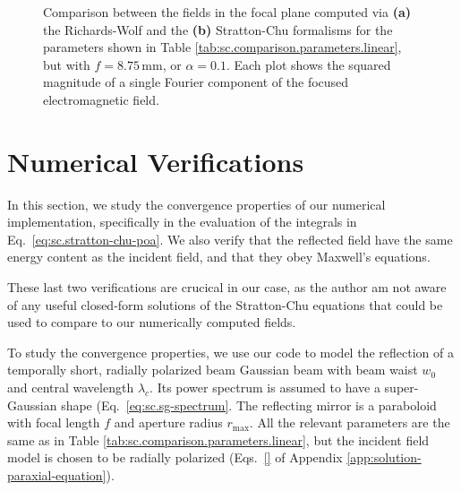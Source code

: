 \documentclass[11pt,SymmetricalJury]{inrsthesis/inrsthesis}
\begin{document}
\begin{figure}
\caption[Richards-Wolf vs Stratton-Chu: fields in the focal plane, VSF.LIN.G.f0.00875.]
        {Comparison between the fields in the focal plane computed via \textbf{(a)}
        the Richards-Wolf and the \textbf{(b)} Stratton-Chu formalisms for the
        parameters shown in Table \ref{tab:sc.comparison.parameters.linear}, but
        with $f=8.75\,\si{\mm}$, or $\alpha=0.1$. Each plot shows
        the squared magnitude of a single Fourier component of the focused
        electromagnetic field.}
\label{fig:sc.sc-vs-rw-vsf-lin-g-f0.0875}
\end{figure}


\section{Numerical Verifications}

In this section, we study the convergence properties of our numerical
implementation, specifically in the evaluation of the integrals in
Eq.~\eqref{eq:sc.stratton-chu-poa}. We also verify that the reflected field have
the same energy content as the incident field, and that they obey Maxwell's
equations.

These last two verifications are crucical in our case, as the author am not
aware of any useful closed-form solutions of the Stratton-Chu equations that
could be used to compare to our numerically computed fields.

To study the convergence properties, we use our code to model the reflection of
a temporally short, radially polarized beam Gaussian beam with beam waist $w_0$
and central wavelength $\lambda_c$. Its power spectrum is assumed to have a
super-Gaussian shape (Eq.~\ref{eq:sc.sg-spectrum}. The reflecting mirror is a
paraboloid with focal length $f$ and aperture radius $r_\text{max}$. All the
relevant parameters are the same as in Table
\ref{tab:sc.comparison.parameters.linear}, but the incident field model is
chosen to be radially polarized (Eqs.~\eqref{} of Appendix
\ref{app:solution-paraxial-equation}).
\end{document}
